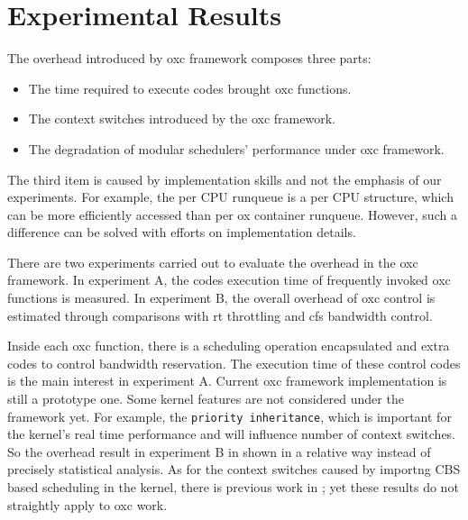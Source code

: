 \chapter{Experimental Results\label{chap:exp}}

The overhead introduced by oxc framework composes three parts:
\begin{itemize}
\item The time required to execute codes brought oxc functions.
\item The context switches introduced by the oxc framework.
\item The degradation of modular schedulers' performance under oxc 
	framework.
\end{itemize}

The third item is caused by implementation skills and not the emphasis
of our experiments. For example, the per CPU runqueue is a per CPU 
structure, which can be more efficiently accessed than per ox container 
runqueue. However, such a difference can be solved with efforts on 
implementation details. 

There are two experiments carried out to evaluate the overhead in the oxc
framework. In experiment A, the codes execution
time of frequently invoked oxc functions is measured. In experiment B, the
overall overhead of oxc control is estimated through comparisons with rt 
throttling and cfs bandwidth control.

Inside each oxc function, there is a scheduling operation encapsulated and
extra codes to control bandwidth reservation. The execution time of these
control codes is the main interest in experiment A.
Current oxc framework implementation is still a prototype one. Some kernel 
features are not considered under the framework yet. For example, the 
\texttt{priority inheritance}, which is important for the kernel's real time
performance and will influence number of context switches. So the overhead
result in experiment B in shown in a relative way instead of precisely 
statistical analysis. As for the context switches caused by importng CBS 
based scheduling in the kernel, there is previous work in \cite{Luigi09};
yet these results do not straightly apply to oxc work. 


